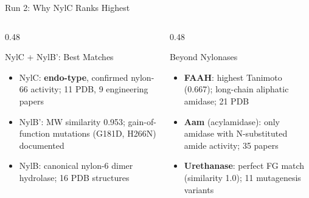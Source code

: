 \documentclass[aspectratio=169, 11pt]{beamer}
\begin{document}
\begin{frame}{Run 2: Why NylC Ranks Highest}
\begin{columns}[T]
\begin{column}{0.48\textwidth}
\begin{exampleblock}{\scriptsize NylC + NylB': Best Matches}
\vspace{-2pt}
\begin{itemize}\scriptsize
\setlength\itemsep{0pt}
\item NylC: \textbf{endo-type}, confirmed nylon-66 activity; 11 PDB, 9 engineering papers
\item NylB': MW similarity 0.953; gain-of-function mutations (G181D, H266N) documented
\item NylB: canonical nylon-6 dimer hydrolase; 16 PDB structures
\end{itemize}
\end{exampleblock}
\end{column}
\begin{column}{0.48\textwidth}
\begin{block}{\scriptsize Beyond Nylonases}
\vspace{-2pt}
\begin{itemize}\scriptsize
\setlength\itemsep{0pt}
\item \textbf{FAAH}: highest Tanimoto (0.667); long-chain aliphatic amidase; 21 PDB
\item \textbf{Aam} (acylamidase): only amidase with N-substituted amide activity; 35 papers
\item \textbf{Urethanase}: perfect FG match (similarity 1.0); 11 mutagenesis variants
\end{itemize}
\end{block}
\end{column}
\end{columns}
\end{frame}
\end{document}
